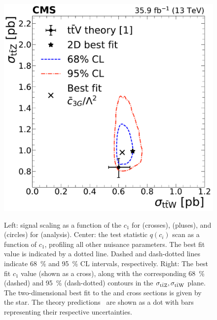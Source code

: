 \begin{landscape}
\begin{figure}
{        \includegraphics[height=\textheight]{figures/thirteen-TeV/NP/2D/ttZ_ttW_2D_1D_c3G}
      }
    \setlength{\capwidth}{14cm}
    \caption[Profile likelihood, $\mu(c_1)$, and best fit $c_1$ for \cthreeG (\thirteenTeV)]{Left: signal scaling as a function of the $c_1$ for \ttW (crosses), \ttZ (pluses), and \ttH (circles) for \cthreeG (\thirteenTeV analysis). Center: the test statistic $q(c_i)$ scan as a function of $c_1$, profiling all other nuisance parameters. The best fit value is indicated by a dotted line. Dashed and dash-dotted lines indicate \SI{68}{\percent} and \SI{95}{\percent} CL intervals, respectively. Right: The best fit $c_1$ value (shown as a cross), along with the corresponding \SI{68}{\percent} (dashed) and \SI{95}{\percent} (dash-dotted) contours in the $\sigma_{\text{t}\bar{\text{t}}\text{Z}}, \sigma_{\text{t}\bar{\text{t}}\text{W}}$ plane. The two-dimensional best fit to the \ttW and \ttZ cross sections is given by the star. The theory predictions~\cite{deFlorian:2016spz} are shown as a dot with bars representing their respective uncertainties.}
    \label{fig:results-c3G}
  \end{figure}
  \begin{figure}
      \resizebox{!}{7.2cm}{
}
\end{figure}
\end{landscape}
